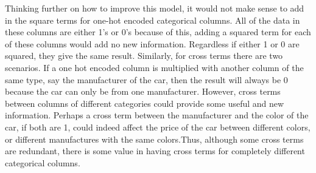 \documentclass[12pt]{article}
\begin{document}
Thinking further on how to improve this model, it would not make sense to add in the square terms for one-hot encoded categorical columns. All of the data in these columns are either 1’s or 0’s because of this, adding a squared term for each of these columns would add no new information. Regardless if either 1 or 0 are squared, they give the same result. Similarly, for cross terms there are two scenarios. If a one hot encoded column is multiplied with another column of the same type, say the manufacturer of the car, then the result will always be 0 because the car can only be from one manufacturer. However, cross terms between columns of different categories could provide some useful and new information. Perhaps a cross term between the manufacturer and the color of the car, if both are 1, could indeed affect the price of the car between different colors, or different manufactures with the same colors.Thus, although some cross terms are redundant, there is some value in having cross terms for completely different categorical columns.
\end{document}

